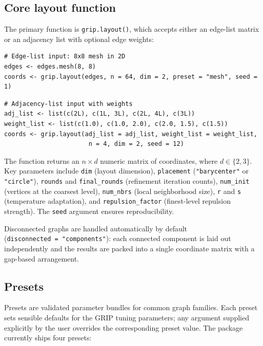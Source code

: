 \subsection{Core layout function}\label{core-layout-function}

The primary function is \texttt{grip.layout()}, which accepts either an edge-list
matrix or an adjacency list with optional edge weights:

\begin{verbatim}
# Edge-list input: 8x8 mesh in 2D
edges <- edges.mesh(8, 8)
coords <- grip.layout(edges, n = 64, dim = 2, preset = "mesh", seed = 1)
\end{verbatim}

\begin{verbatim}
# Adjacency-list input with weights
adj_list <- list(c(2L), c(1L, 3L), c(2L, 4L), c(3L))
weight_list <- list(c(1.0), c(1.0, 2.0), c(2.0, 1.5), c(1.5))
coords <- grip.layout(adj_list = adj_list, weight_list = weight_list,
                       n = 4, dim = 2, seed = 12)
\end{verbatim}

The function returns an \(n \times d\) numeric matrix of coordinates, where
\(d \in \{2, 3\}\). Key parameters include \texttt{dim} (layout dimension), \texttt{placement}
(\texttt{"barycenter"} or \texttt{"circle"}), \texttt{rounds} and \texttt{final\_rounds} (refinement
iteration counts), \texttt{num\_init} (vertices at the coarsest level), \texttt{num\_nbrs}
(local neighborhood size), \texttt{r} and \texttt{s} (temperature adaptation), and
\texttt{repulsion\_factor} (finest-level repulsion strength). The \texttt{seed} argument
ensures reproducibility.

Disconnected graphs are handled automatically by default
(\texttt{disconnected\ =\ "components"}): each connected component is laid out
independently and the results are packed into a single coordinate matrix
with a gap-based arrangement.

\subsection{Presets}\label{presets}

Presets are validated parameter bundles for common graph families. Each preset
sets sensible defaults for the GRIP tuning parameters; any argument supplied
explicitly by the user overrides the corresponding preset value. The package
currently ships four presets:

